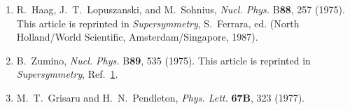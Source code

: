 


\begin{enumerate}
  \item {}\label{ch25-ref-1}
  R.~Haag, J.~T.~Lopuszanski, and M.~Sohnius, \textit{Nucl. Phys.}
  B\textbf{88}, 257 (1975). This article is reprinted in
  \textit{Supersymmetry}, S.~Ferrara, ed. (North Holland/World
  Scientific, Amsterdam/Singapore, 1987).

  \item {}\label{ch25-ref-2}
  B.~Zumino, \textit{Nucl. Phys.} B\textbf{89}, 535 (1975). This article
  is reprinted in \textit{Supersymmetry},
  Ref.~\hyperref[ch25-ref-1]{1}.

  \item {}\label{ch25-ref-3}
  M.~T.~Grisaru and H.~N.~Pendleton, \textit{Phys. Lett.}
  \textbf{67B}, 323 (1977).
\end{enumerate}
